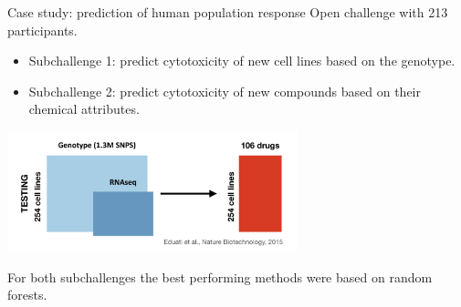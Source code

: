 \documentclass[notes]{beamer}          %
\begin{document}
\begin{frame}{Case study: prediction of human population response}
Open challenge with 213 participants.
\begin{itemize}
\item Subchallenge 1: predict cytotoxicity of new cell lines based on the genotype.

\item Subchallenge 2: predict cytotoxicity of new compounds based on their chemical attributes.

\end{itemize}
\begin{center}
\includegraphics[height=3.5cm]{../figures/week_6/Challenge.pdf}  
\end{center}
For both subchallenges the best performing methods were based on random forests.

\end{frame}



%
\end{document}
